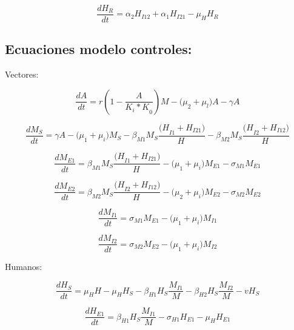 \documentclass[journal]{IEEEtran}
\begin{document}
\begin{equation}
    \label{eq1}
    \frac{dH_R}{dt}=\alpha_2H_{I12}+\alpha_1H_{I21}-\mu_HH_R
\end{equation}


\subsection{Ecuaciones modelo controles:}


Vectores:

\begin{equation}
    \label{eq1}
    \frac{dA}{dt}=r\left(1-\frac{A}{{K_i\ast K}_0}\right)M-{(\mu}_2+\mu_l)A-\gamma A
\end{equation}

\begin{equation}
    \label{eq1}
    \frac{dM_S}{dt}=\gamma A-{(\mu}_1+\mu_i)M_S-\beta_{M1}M_S\frac{{(H}_{I1}+H_{I21})}{H\ }-\beta_{M2}M_S\frac{{(H}_{I2}+H_{I12})}{H\ }
\end{equation}

\begin{equation}
    \label{eq1}
    \frac{dM_{E1}}{dt}=\beta_{M1}M_S\frac{{(H}_{I1}+H_{I21})}{H\ }-{(\mu}_1+\mu_i)M_{E1}-\sigma_{M1}M_{E1}
\end{equation}

\begin{equation}
    \label{eq1}
    \frac{dM_{E2}}{dt}=\beta_{M2}M_S\frac{{(H}_{I2}+H_{I12})}{H\ }-{(\mu}_2+\mu_i)M_{E2}-\sigma_{M2}M_{E2}
\end{equation}

\begin{equation}
    \label{eq1}
    \frac{dM_{I1}}{dt}=\sigma_{M1}M_{E1}-{(\mu}_1+\mu_i)M_{I1}
\end{equation}

\begin{equation}
    \label{eq1}
    \frac{dM_{I2}}{dt}=\sigma_{M2}M_{E2}-{(\mu}_1+\mu_i)M_{I2}
\end{equation}


Humanos:

\begin{equation}
    \label{eq1}
    \frac{dH_S}{dt}=\mu_HH-\mu_HH_S-\beta_{H1}H_S\frac{M_{I1}}{M}-\beta_{H2}H_S\frac{M_{I2}}{M}-vH_S
\end{equation}

\begin{equation}
    \label{eq1}
    \frac{dH_{E1}}{dt}=\beta_{H1}H_S\frac{M_{I1}}{M}-\sigma_{H1}H_{E1}-\mu_HH_{E1}
\end{equation}
\end{document}
